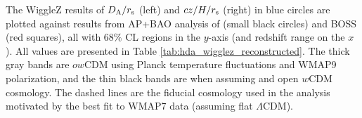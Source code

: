 \label{fig:hubble_diagram} The WiggleZ results of $D_{\rm A}/r_{\rm s}$ (left) and $cz/H/r_{\rm s}$ (right) in blue circles are plotted against results from AP+BAO analysis of \cite{Blake_2012} (small black circles) and BOSS \cite{Anderson_2014} (red squares), all with 68$\%$ CL regions in the $y$-axis (and redshift range on the $x$). All values are presented in Table \ref{tab:hda_wigglez_reconstructed}. The thick gray bands are $ow$CDM using Planck temperature fluctuations and WMAP9 polarization, and the thin black bands are when assuming and open $w$CDM cosmology. The dashed lines are the fiducial cosmology used in the analysis motivated by the best fit to WMAP7 data (assuming flat $\Lambda$CDM).  
